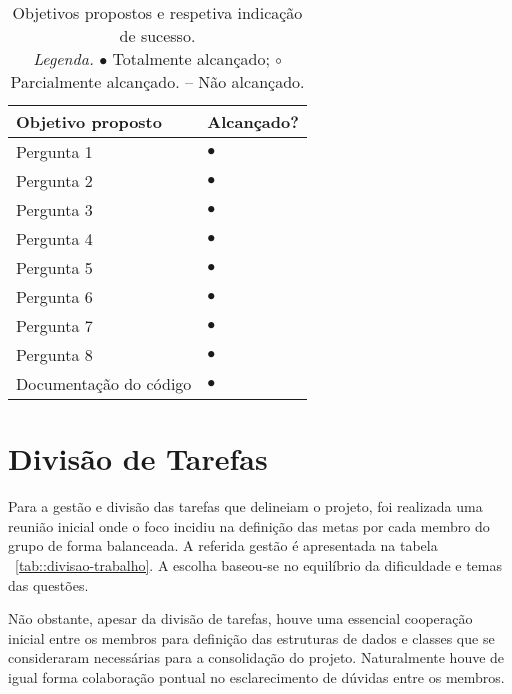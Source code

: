 \begin{table}[!htbp]
	\centering
	\begin{tabular}{p{} >{\centering\let\newline\\\arraybackslash\hspace{0pt}}m{}}
		\toprule
		{\bfseries Objetivo proposto} & {\bfseries Alcançado?} \\
		\midrule
		Pergunta 1 & $\bullet$             \\
		Pergunta 2 & $\bullet$             \\
		Pergunta 3 & $\bullet$             \\
		Pergunta 4 & $\bullet$             \\
		Pergunta 5 & $\bullet$             \\
		Pergunta 6 & $\bullet$             \\
		Pergunta 7 & $\bullet$             \\
		Pergunta 8 & $\bullet$             \\
		Documentação do código & $\bullet$ \\
		\bottomrule
	\end{tabular}
	\caption[Objetivos propostos vs. alcançados]{
		Objetivos propostos e respetiva indicação de sucesso.\\
		\textit{Legenda.} $\bullet$ Totalmente alcançado; $\circ$ Parcialmente alcançado. -- Não alcançado.
	}
	\label{tab::objetivos}
\end{table}


\section{Divisão de Tarefas}
\label{sec::reflexao:divisao}

Para a gestão e divisão das tarefas que delineiam o projeto, foi realizada uma reunião inicial onde o foco incidiu na definição das metas por cada membro do grupo de forma balanceada. A referida gestão é apresentada na tabela ~\ref{tab::divisao-trabalho}. A escolha baseou-se no equilíbrio da dificuldade e temas das questões.

Não obstante, apesar da divisão de tarefas, houve uma essencial cooperação inicial entre os membros para definição das estruturas de dados e classes que se consideraram necessárias para a consolidação do projeto. Naturalmente houve de igual forma colaboração pontual no esclarecimento de dúvidas entre os membros.

